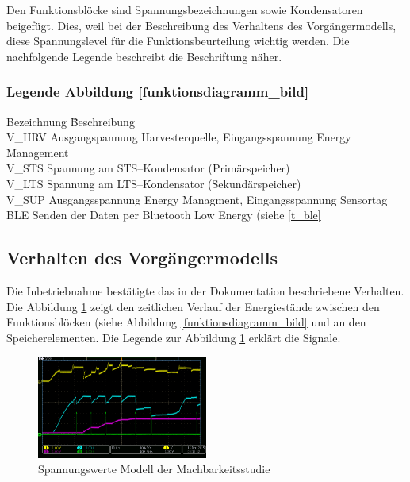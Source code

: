 Den Funktionsblöcke sind Spannungsbezeichnungen sowie Kondensatoren beigefügt. Dies, weil bei der Beschreibung des Verhaltens des Vorgängermodells, diese Spannungslevel für die Funktionsbeurteilung wichtig werden. Die nachfolgende Legende beschreibt die Beschriftung näher.

\subsubsection*{Legende Abbildung \ref{funktionsdiagramm_bild} }
\label{legende}
\begin{tabbing}
    Bezeichnung \quad\= Beschreibung\\[0.8ex]
    V\_HRV \> Ausgangspannung Harvesterquelle, Eingangsspannung Energy Management\\
    V\_STS\> Spannung am STS--Kondensator (Primärspeicher)\\
    V\_LTS\> Spannung am LTS--Kondensator (Sekundärspeicher)\\
    V\_SUP\> Ausgangsspannung Energy Managment, Eingangsspannung Sensortag\\
    BLE \> Senden der Daten per Bluetooth Low Energy (siehe \ref{t_ble} \\
\end{tabbing}   

\subsection{Verhalten des Vorgängermodells}\label{verhalten} 

Die Inbetriebnahme bestätigte das in der Dokumentation \cite{PA_bicycle} beschriebene Verhalten. Die Abbildung \ref{spannungMachbarkeit} zeigt den zeitlichen Verlauf der Energiestände zwischen den Funktionsblöcken (siehe Abbildung \ref{funktionsdiagramm_bild} und an den Speicherelementen. Die Legende zur Abbildung  \ref{spannungMachbarkeit} erklärt die Signale.

\begin{figure}[ht]
    \includegraphics[width=0.5\textwidth]{3Vorgehen/imag/messungPA.png}
    \caption{Spannungswerte Modell der Machbarkeitsstudie}\label{spannungMachbarkeit} 
\end{figure}

